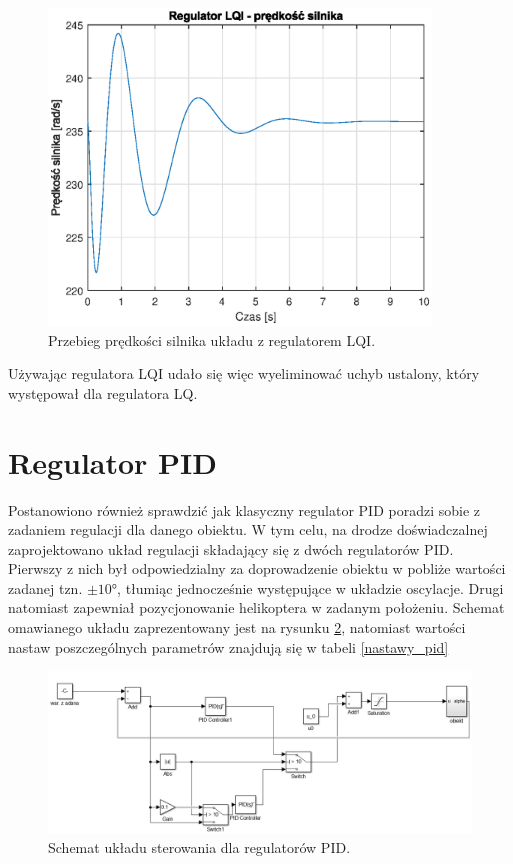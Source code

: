 \documentclass[11pt,a4paper]{article}
\begin{document}
\begin{figure}[H]
	\centering
	\includegraphics[width=4in]{Figures/LQI_model_obs_03_w_v.eps}
	\caption{Przebieg prędkości silnika układu z regulatorem LQI.}
	\label{fig:LQI_model_obs_03_w_v}
\end{figure}

Używając regulatora LQI udało się więc wyeliminować uchyb ustalony, który występował dla regulatora LQ.

\section{Regulator PID}
Postanowiono również sprawdzić jak klasyczny regulator PID poradzi sobie z zadaniem regulacji dla danego obiektu. W tym celu, na drodze doświadczalnej zaprojektowano układ regulacji składający się z dwóch regulatorów PID. Pierwszy z nich był odpowiedzialny za doprowadzenie obiektu w pobliże wartości zadanej tzn. \(\pm\ang{10}\), tłumiąc jednocześnie występujące w układzie oscylacje. Drugi natomiast zapewniał pozycjonowanie helikoptera w zadanym położeniu. Schemat omawianego układu zaprezentowany jest na rysunku \ref{fig:pid_schemat}, natomiast wartości nastaw poszczególnych parametrów znajdują się w tabeli \ref{nastawy_pid} 

\begin{figure}[H]
	\centering
	\includegraphics[width=5.9in]{Figures/PID_schemat.png}
	\caption{Schemat układu sterowania dla regulatorów PID.}
	\label{fig:pid_schemat}
\end{figure}
\end{document}
